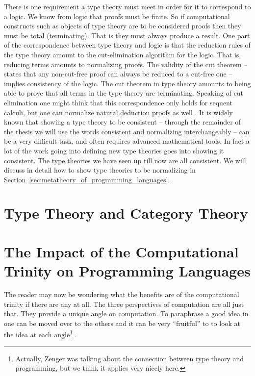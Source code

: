 There is one requirement a type theory must meet in order for it to
correspond to a logic.  We know from logic that proofs must be finite.
So if computational constructs such as objects of type theory are to
be considered proofs then they must be total (terminating).  That is
they must always produce a result.  One part of the correspondence
between type theory and logic is that the reduction rules of the type
theory amount to the cut-elimination algorithm for the logic.  That is,
reducing terms amounts to normalizing proofs.  The validity of the cut
theorem -- states that any non-cut-free proof can always be reduced to
a cut-free one -- implies consistency of the logic.  The cut theorem
in type theory amounts to being able to prove that all terms in the
type theory are terminating.  Speaking of cut elimination one might
think that this correspondence only holds for sequent calculi, but one
can normalize natural deduction proofs as well \cite{Prawitz:1965}.
It is widely known that showing a type theory to be consistent --
through the remainder of the thesis we will use the words consistent
and normalizing interchangeably -- can be a very difficult task, and
often requires advanced mathematical tools.  In fact a lot of the work
going into defining new type theories goes into showing it consistent.
The type theories we have seen up till now are all consistent.  We
will discuss in detail how to show type theories to be normalizing in
Section~\ref{sec:metatheory_of_programming_languages}.

\section{Type Theory and Category Theory}
\label{sec:tt_ct}


\section{The Impact of the Computational Trinity on Programming Languages}
\label{sec:three_perspectives_programming_languages}
The reader may now be wondering what the benefits are of the computational
trinity if there are any at all.  The three
perspectives of computation are all just that.  They provide a unique
angle on computation. To paraphrase \cite{Zenger:1997} a good idea in
one can be moved over to the others and it can be very ``fruitful'' to
to look at the idea at each angle\footnote{Actually, Zenger was
  talking about the connection between type theory and programming,
  but we think it applies very nicely here.} .

